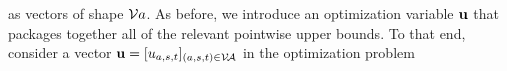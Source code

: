 \documentclass[twoside]{article}
\begin{document}
as vectors of shape $\mathcal V a$.
As before, we introduce an optimization variable $\mathbf{u}$ that packages together
    all of the relevant pointwise upper bounds.
To that end, consider a 
vector
$\mathbf{u} = [u_{a,s,t}]_{(a,s,t) \in \mathcal V\!\mathcal A}$
in the optimization problem
%
%
\end{document}
